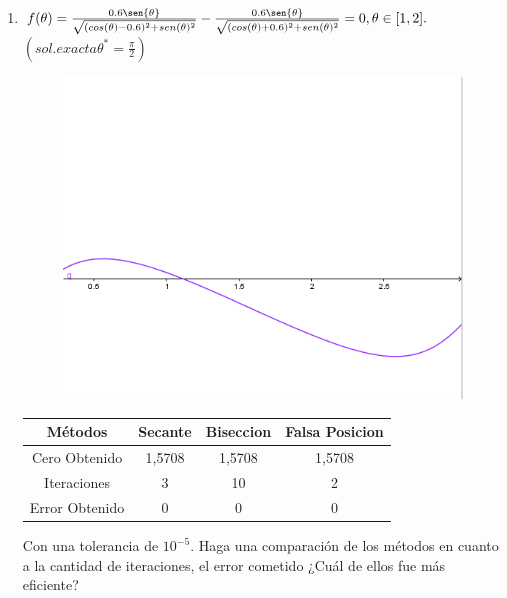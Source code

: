 \documentclass{udpreport}
\begin{document}
\begin{enumerate}
\begin{enumerate}
\begin{table}[H]
\begin{tabular} { |c|c|c|c|}
            \end{tabular}
        \end{table}
    \newpage
    \item $ f (\theta) = \frac{0.6\sen{\theta}}{\sqrt{(cos(\theta) - 0.6)^2 + sen(\theta)^2}} -  \frac{0.6\sen{\theta}}{\sqrt{(cos(\theta) + 0.6)^2 + sen(\theta)^2}} = 0, \theta \in [1,2].$
    $(sol. exacta \theta^* = \frac{\pi}{2})$
    
        \begin{figure}[H]
        \centering
        \includegraphics[width=11cm]{GraficoEj1e}
        \end{figure}
    
        \begin{table}[H]
        \centering
            \begin{tabular} { |c|c|c|c|}
            
            \hline
            Métodos       & Secante & Biseccion & Falsa Posicion \\
            \hline
            Cero Obtenido &  1,5708       &   1,5708       &      1,5708        \\
            \hline
            Iteraciones   &     3        &      10        &        2       \\
            \hline
            Error Obtenido  &   0        &      0      &          0  \\
            \hline
            
            \end{tabular}
        \end{table}
        
    Con una tolerancia de $ 10^{-5} $. Haga una comparación de los métodos en cuanto a la cantidad de iteraciones, el error cometido ¿Cuál de ellos fue más eficiente?
    

\end{enumerate}
\end{enumerate}
\end{document}

